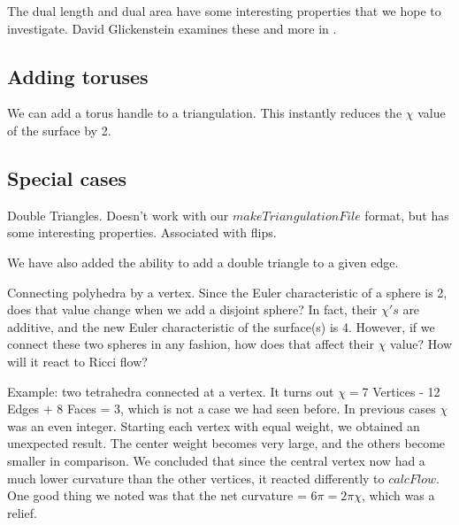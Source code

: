 \documentclass[12pt]{article}
\begin{document}
\noindent The dual length and dual area have some interesting properties that we hope to investigate. David Glickenstein examines these and more in \cite{Dave}.  

\subsection{Adding toruses}
\maketitle

We can add a torus handle to a triangulation. This instantly reduces the $\chi$ value of the surface by 2. 

\subsection{Special cases}
\maketitle

Double Triangles. Doesn't work with our $makeTriangulationFile$ format, but has some interesting properties. Associated with flips.\newline

\noindent We have also added the ability to add a double triangle to a given edge. 

\noindent Connecting polyhedra by a vertex. Since the Euler characteristic of a sphere is 2, does that value change when we add a disjoint sphere? In fact, their $\chi's$ are additive, and the new Euler characteristic of the surface(s) is 4. \cite{wiki}However, if we connect these two spheres in any fashion, how does that affect their $\chi$ value? How will it react to Ricci flow? \newline

\noindent Example: two tetrahedra connected at a vertex. It turns out $\chi = $7 Vertices - 12 Edges + 8 Faces = 3, which is not a case we had seen before. In previous cases $\chi$ was an even integer. Starting each vertex with equal weight, we obtained an unexpected result. The center weight becomes very large, and the others become smaller in comparison. We concluded that since the central vertex now had a much lower curvature than the other vertices, it reacted differently to $calcFlow$. One good thing we noted was that the net curvature = $6\pi = 2\pi\chi$, which was a relief.  
\end{document}
